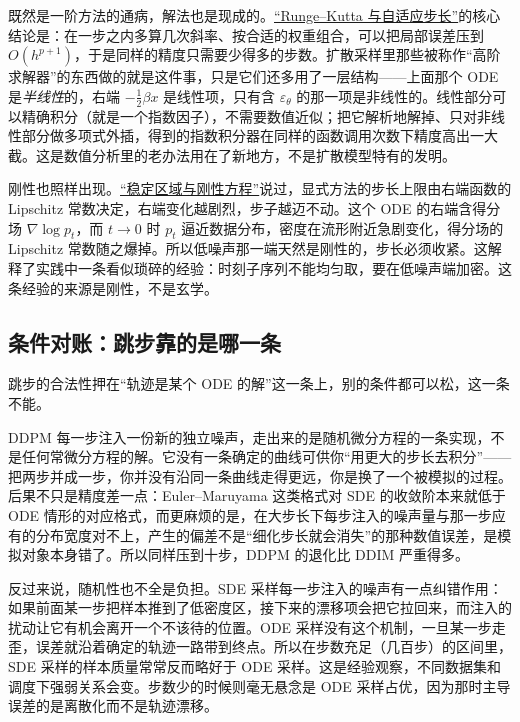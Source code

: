 既然是一阶方法的通病，解法也是现成的。\hyperref[sec:08-Numerical-Analysis/06-ODE/02]{``Runge--Kutta 与自适应步长''}的核心结论是：在一步之内多算几次斜率、按合适的权重组合，可以把局部误差压到 \(O(h^{p+1})\)，于是同样的精度只需要少得多的步数。扩散采样里那些被称作``高阶求解器''的东西做的就是这件事，只是它们还多用了一层结构——上面那个 ODE 是\emph{半线性}的，右端 \(-\frac12\beta x\) 是线性项，只有含 \(\varepsilon_\theta\) 的那一项是非线性的。线性部分可以精确积分（就是一个指数因子），不需要数值近似；把它解析地解掉、只对非线性部分做多项式外插，得到的指数积分器在同样的函数调用次数下精度高出一大截。这是数值分析里的老办法用在了新地方，不是扩散模型特有的发明。

刚性也照样出现。\hyperref[sec:08-Numerical-Analysis/06-ODE/03]{``稳定区域与刚性方程''}说过，显式方法的步长上限由右端函数的 Lipschitz 常数决定，右端变化越剧烈，步子越迈不动。这个 ODE 的右端含得分场 \(\nabla\log p_t\)，而 \(t\to0\) 时 \(p_t\) 逼近数据分布，密度在流形附近急剧变化，得分场的 Lipschitz 常数随之爆掉。所以低噪声那一端天然是刚性的，步长必须收紧。这解释了实践中一条看似琐碎的经验：时刻子序列不能均匀取，要在低噪声端加密。这条经验的来源是刚性，不是玄学。

\subsection{条件对账：跳步靠的是哪一条}

跳步的合法性押在``轨迹是某个 ODE 的解''这一条上，别的条件都可以松，这一条不能。

DDPM 每一步注入一份新的独立噪声，走出来的是随机微分方程的一条实现，不是任何常微分方程的解。它没有一条确定的曲线可供你``用更大的步长去积分''——把两步并成一步，你并没有沿同一条曲线走得更远，你是换了一个被模拟的过程。后果不只是精度差一点：Euler--Maruyama 这类格式对 SDE 的收敛阶本来就低于 ODE 情形的对应格式，而更麻烦的是，在大步长下每步注入的噪声量与那一步应有的分布宽度对不上，产生的偏差不是``细化步长就会消失''的那种数值误差，是模拟对象本身错了。所以同样压到十步，DDPM 的退化比 DDIM 严重得多。

反过来说，随机性也不全是负担。SDE 采样每一步注入的噪声有一点纠错作用：如果前面某一步把样本推到了低密度区，接下来的漂移项会把它拉回来，而注入的扰动让它有机会离开一个不该待的位置。ODE 采样没有这个机制，一旦某一步走歪，误差就沿着确定的轨迹一路带到终点。所以在步数充足（几百步）的区间里，SDE 采样的样本质量常常反而略好于 ODE 采样。这是经验观察，不同数据集和调度下强弱关系会变。步数少的时候则毫无悬念是 ODE 采样占优，因为那时主导误差的是离散化而不是轨迹漂移。

